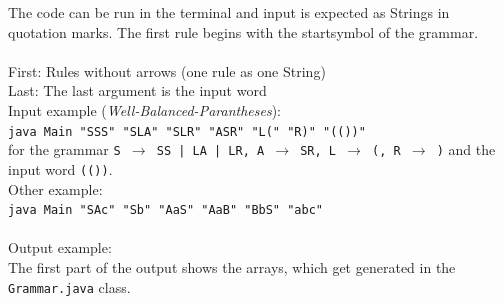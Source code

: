 \documentclass[a4paper, 11pt]{article}
\newcommand{\dq}{"}
\begin{document}
The code can be run in the terminal and input is expected as Strings in quotation marks. The first rule begins with the startsymbol of the grammar. \\ \\
First: Rules without arrows (one rule as one String) \\
Last: The last argument is the input word
\\ 
Input example (\textit{Well-Balanced-Parantheses}):\\
  \texttt{java Main \dq SSS\dq \ \dq SLA\dq \ \dq SLR\dq \ \dq ASR\dq \ \dq L(\dq \ \dq R)\dq\  \dq (())\dq} \\
  for the grammar \texttt{S $\rightarrow$ SS | LA | LR, A $\rightarrow$ SR, L $\rightarrow$ (, R $\rightarrow$ )} and the input word \texttt{(())}. \\
Other example: \\
 \texttt{java Main \dq SAc\dq \ \dq Sb\dq \ \dq AaS\dq \ \dq AaB\dq \ \dq BbS\dq \ \dq abc\dq } 
\\ 
\\
Output example: \\
The first part of the output shows the arrays, which get generated in the \texttt{Grammar.java} class.  \\ \\
\end{document}

